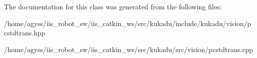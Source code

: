 The documentation for this class was generated from the following files\+:\begin{DoxyCompactItemize}
\item 
/home/agyss/iis\+\_\+robot\+\_\+sw/iis\+\_\+catkin\+\_\+ws/src/kukadu/include/kukadu/vision/pcstdtrans.\+hpp\item 
/home/agyss/iis\+\_\+robot\+\_\+sw/iis\+\_\+catkin\+\_\+ws/src/kukadu/src/vision/pcstdtrans.\+cpp\end{DoxyCompactItemize}
